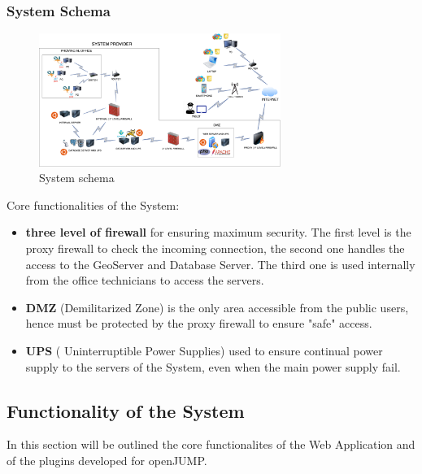 \subsubsection{System Schema}

     \begin{figure}
        \centering
        \includegraphics[width=0.7\textwidth]{images/system.png}
        \caption{System schema}
        \label{fig:yourlabel}
       \end{figure}


 Core functionalities of the System:
 \begin{itemize}
     \item \textbf{three level of firewall} for ensuring maximum security. The first level is the proxy firewall to check the incoming connection, the second one handles the access to the GeoServer and Database Server.
     The third one is used internally from the office technicians to access the servers.
     \item \textbf{DMZ} (Demilitarized Zone) is the only area accessible from the public users, hence must be protected by the proxy firewall to ensure "safe" access.
     \item \textbf{UPS} ( Uninterruptible Power Supplies) used to ensure continual power supply to the servers of the System, even when the main power supply fail.
 \end{itemize}

 \subsection{Functionality of the System}
 In this section will be outlined the core functionalites of the Web Application and of the plugins developed for openJUMP.

